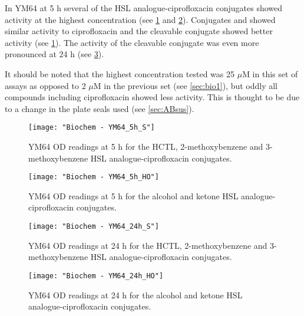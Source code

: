 
In YM64 at 5 h several of the HSL analogue-ciprofloxacin conjugates showed activity at the highest concentration (see \ref{fgr:YM64_5h_S} and \ref{fgr:YM64_5h_HO}). 
Conjugates  and  showed similar activity to ciprofloxacin  and the cleavable conjugate
 showed better activity (see \ref{fgr:YM64_5h_S}).
The activity of the cleavable conjugate  was even more pronounced at 24 h (see \ref{fgr:YM64_24h_S}).

It should be noted that the highest concentration tested was 25 $\mu$M in this set of assays as opposed to 2 $\mu$M in the previous set (see \ref{sec:bio1}), but oddly all compounds including ciprofloxacin  showed less activity. This is thought to be due to a change in the plate seals used (see \ref{sec:ABsus}). 


\begin{figure}[H]
	\begin{center}
		\texttt{[image: "Biochem - YM64\_5h\_S"]}
		\caption{YM64 OD readings at 5 h for the HCTL, 2-methoxybenzene and 3-methoxybenzene HSL analogue-ciprofloxacin conjugates.\label{fgr:YM64_5h_S}}
	\end{center}
\end{figure}

\begin{figure}[H]
	\begin{center}
		\texttt{[image: "Biochem - YM64\_5h\_HO"]}
		\caption{YM64 OD readings at 5 h for the alcohol and ketone HSL analogue-ciprofloxacin conjugates.\label{fgr:YM64_5h_HO}}
	\end{center}
\end{figure}

\begin{figure}[H]
	\begin{center}
		\texttt{[image: "Biochem - YM64\_24h\_S"]}
		\caption{YM64 OD readings at 24 h for the HCTL, 2-methoxybenzene and 3-methoxybenzene HSL analogue-ciprofloxacin conjugates.\label{fgr:YM64_24h_S}}
	\end{center}
\end{figure}

\begin{figure}[H]
	\begin{center}
		\texttt{[image: "Biochem - YM64\_24h\_HO"]}
		\caption{YM64 OD readings at 24 h for the alcohol and ketone HSL analogue-ciprofloxacin conjugates.\label{fgr:YM64_24h_HO}}
	\end{center}
\end{figure}

